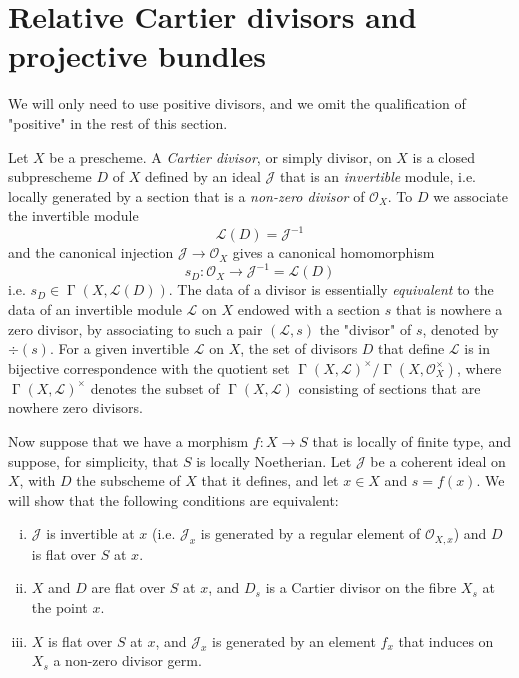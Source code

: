 \section{Relative Cartier divisors and projective bundles}\label{fga3.v-4}


We will only need to use positive divisors, and we omit the qualification of "positive" in the rest of this section.

Let $X$ be a prescheme.
A \emph{Cartier divisor}, or simply divisor, on $X$ is a closed subprescheme $D$ of $X$ defined by an ideal $\mathcal{J}$ that is an \emph{invertible} module, i.e. locally generated by a section that is a \emph{non-zero divisor} of $\mathcal{O}_X$.
To $D$ we associate the invertible module
\[
    \mathcal{L}(D) = \mathcal{J}^{-1}
\]
and the canonical injection $\mathcal{J}\to\mathcal{O}_X$ gives a canonical homomorphism
\[
    s_D\colon \mathcal{O}_X \to \mathcal{J}^{-1} = \mathcal{L}(D)
\]
i.e. $s_D\in\operatorname{\Gamma}(X,\mathcal{L}(D))$.
The data of a divisor is essentially \emph{equivalent} to the data of an invertible module $\mathcal{L}$ on $X$ endowed with a section $s$ that is nowhere a zero divisor, by associating to such a pair $(\mathcal{L},s)$ the "divisor" of $s$, denoted by $\div(s)$.
For a given invertible $\mathcal{L}$ on $X$, the set of divisors $D$ that define $\mathcal{L}$ is in bijective correspondence with the quotient set $\operatorname{\Gamma}(X,\mathcal{L})^{\times}/\operatorname{\Gamma}(X,\mathcal{O}_X^\times)$, where $\operatorname{\Gamma}(X,\mathcal{L})^\times$ denotes the subset of $\operatorname{\Gamma}(X,\mathcal{L})$ consisting of sections that are nowhere zero divisors.

Now suppose that we have a morphism $f\colon X\to S$ that is locally of finite type, and suppose, for simplicity, that $S$ is locally Noetherian.
Let $\mathcal{J}$ be a coherent ideal on $X$, with $D$ the subscheme of $X$ that it defines, and let $x\in X$ and $s=f(x)$.
We will show that the following conditions are equivalent:
\begin{enumerate}[i.]
    \item $\mathcal{J}$ is invertible at $x$ (i.e. $\mathcal{J}_x$ is generated by a regular element of $\mathcal{O}_{X,x}$) and $D$ is flat over $S$ at $x$.
    \item  $X$ and $D$ are flat over $S$ at $x$, and $D_s$ is a Cartier divisor on the fibre $X_s$ at the point $x$.
    \item $X$ is flat over $S$ at $x$, and $\mathcal{J}_x$ is generated by an element $f_x$ that induces on $X_s$ a non-zero divisor germ.
\end{enumerate}

